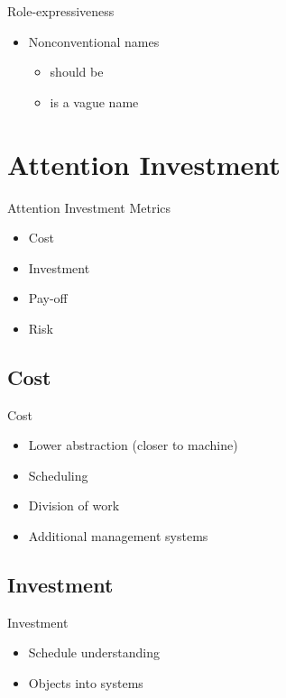 \begin{frame}{\secname}{\subsecname}
	Role-expressiveness
	\begin{itemize}
		\item Nonconventional names
		\begin{itemize}
			\item {} should be 
			\item {} is a vague name
		\end{itemize}
	\end{itemize}
\end{frame}

\section{Attention Investment}
\begin{frame}{\secname}{\subsecname}
	Attention Investment Metrics
	\begin{itemize}
		\item Cost
		\item Investment
		\item Pay-off
		\item Risk
	\end{itemize}
\end{frame}

\subsection{Cost}
\begin{frame}{\secname}{\subsecname}
	Cost
	\begin{itemize}
		\item Lower abstraction (closer to machine)
		\item Scheduling
		\item Division of work
		\item Additional management systems
	\end{itemize}
\end{frame}

\subsection{Investment}
\begin{frame}{\secname}{\subsecname}
	Investment
	\begin{itemize}
		\item Schedule understanding
		\item Objects into systems
	\end{itemize}
\end{frame}

